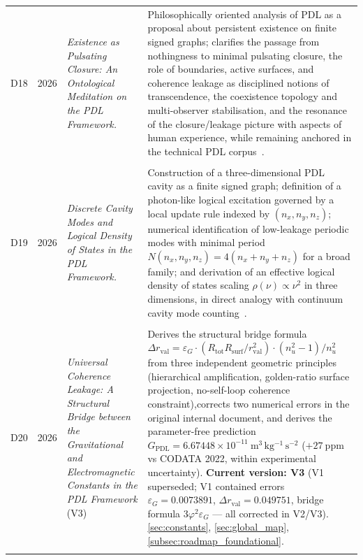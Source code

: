 \documentclass[11pt,a4paper]{article}
\begin{document}
\begin{longtable}{@{}llL{4cm}p{9.0cm}@{}}
D18 &
2026 &
\emph{Existence as Pulsating Closure: An Ontological Meditation on the PDL Framework.} & 
Philosophically oriented analysis of PDL as a proposal about persistent existence on finite signed graphs; clarifies the passage from nothingness to minimal pulsating closure, the role of boundaries, active surfaces, and coherence leakage as disciplined notions of transcendence, the coexistence topology and multi-observer stabilisation, and the resonance of the closure/leakage picture with aspects of human experience, while remaining anchored in the technical PDL corpus~\citep{ExistencePulsatingClosure2026}.\\\\[0.4em]

D19 &
2026 &
\emph{Discrete Cavity Modes and Logical Density of States in the PDL Framework.}
 & Construction of a three-dimensional PDL cavity as a finite signed graph; definition of a photon-like logical excitation governed by a local update rule indexed by $(n_x,n_y,n_z)$; numerical identification of low-leakage periodic modes with minimal period $N(n_x,n_y,n_z)=4(n_x+n_y+n_z)$ for a broad family; and derivation of an effective logical density of states scaling $\rho(\nu)\propto \nu^2$ in three dimensions, in direct analogy with continuum cavity mode counting~\citep{PDLCavityModes2026}.\\\\[0.4em]

D20 & 
2026 &
\emph{Universal Coherence Leakage: A Structural Bridge between the Gravitational and Electromagnetic Constants in the PDL Framework} (V3) 
& Derives the structural bridge formula $\Delta r_{\mathrm{val}} = \varepsilon_G \cdot (R_{\mathrm{tot}} R_{\mathrm{surf}}/r_{\mathrm{val}}^2) \cdot (n_u^2-1)/n_u^2$ from three independent geometric principles (hierarchical amplification, golden-ratio surface projection, no-self-loop coherence constraint),corrects two numerical errors in the original internal document, and derives the parameter-free prediction $G_{\mathrm{PDL}} = 6.67448\times10^{-11}~\mathrm{m^3\,kg^{-1}\,s^{-2}}$ ($+27~\mathrm{ppm}$ vs CODATA 2022, within experimental uncertainty). \textbf{Current version: V3} (V1 superseded; V1 contained errors $\varepsilon_G = 0.0073891$, $\Delta r_{\mathrm{val}} = 0.049751$, bridge formula $3\varphi^2\varepsilon_G$ — all corrected in V2/V3). \citep{Universal_Coherence_Leakage_V3_2026} \ref{sec:constants}, \ref{sec:global_map}, \ref{subsec:roadmap_foundational}.\\\\[0.4em]


\end{longtable}
\end{document}
